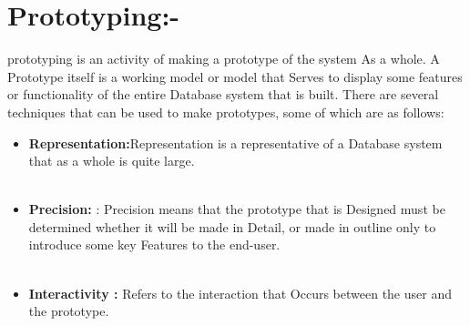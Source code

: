 \documentclass{article}
\begin{document}
\section*{Prototyping:-}prototyping is an activity of making a prototype of the system As a whole.
A Prototype itself is a working model or model that Serves to display some
features or functionality of the entire Database system that is built. There
are several techniques that can be used to make prototypes, some of which
are as follows:
\begin{itemize}
    \item \textbf{Representation:}Representation is a representative of a Database
system that as a whole is quite large.
\\
\\
\item \textbf{Precision: }: Precision means that the prototype that is Designed must
be determined whether it will be made in Detail, or made in outline
only to introduce some key Features to the end-user.
\\
\\
\item \textbf{Interactivity :} Refers to the interaction that Occurs between the user and the prototype.
\end{itemize}
\end{document}

